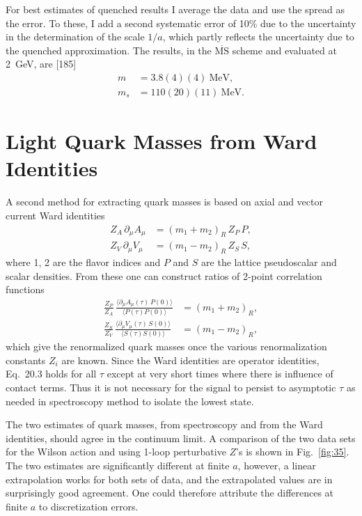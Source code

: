 For best estimates of quenched results I average the data and use the spread as the error. To these, I add a second systematic error of 10\% due to the uncertainty in the determination of the scale $1/a$, which partly reflects the uncertainty due to the quenched approximation. The results, in the $\overline{\mathrm{MS}}$ scheme and evaluated at 2~GeV, are [185]
\begin{equation}
\begin{aligned}
m &= 3.8(4)(4)~\mathrm{MeV}, \\
m_s &= 110(20)(11)~\mathrm{MeV}.
\end{aligned}
\end{equation}

\section{Light Quark Masses from Ward Identities}

A second method for extracting quark masses is based on axial and vector current Ward identities
\begin{equation}
\begin{aligned}
Z_A\,\partial_\mu A_\mu &= (m_1 + m_2)_R\, Z_P\, P, \\
Z_V\,\partial_\mu V_\mu &= (m_1 - m_2)_R\, Z_S\, S,
\end{aligned}
\end{equation}
where 1, 2 are the flavor indices and $P$ and $S$ are the lattice pseudoscalar and scalar densities. From these one can construct ratios of 2-point correlation functions
\begin{equation}
\begin{aligned}
\frac{Z_P}{Z_A}\,\frac{\langle \partial_\mu A_\mu(\tau)\,P(0)\rangle}{\langle P(\tau)P(0)\rangle} &= (m_1 + m_2)_R, \\
\frac{Z_S}{Z_V}\,\frac{\langle \partial_\mu V_\mu(\tau)\,S(0)\rangle}{\langle S(\tau)S(0)\rangle} &= (m_1 - m_2)_R,
\end{aligned}
\end{equation}
which give the renormalized quark masses once the various renormalization constants $Z_i$ are known. Since the Ward identities are operator identities, Eq.~20.3 holds for all $\tau$ except at very short times where there is influence of contact terms. Thus it is not necessary for the signal to persist to asymptotic $\tau$ as needed in spectroscopy method to isolate the lowest state.

The two estimates of quark masses, from spectroscopy and from the Ward identities, should agree in the continuum limit. A comparison of the two data sets for the Wilson action and using 1-loop perturbative $Z$'s is shown in Fig.~\ref{fig:35}. The two estimates are significantly different at finite $a$, however, a linear extrapolation works for both sets of data, and the extrapolated values are in surprisingly good agreement. One could therefore attribute the differences at finite $a$ to discretization errors.

